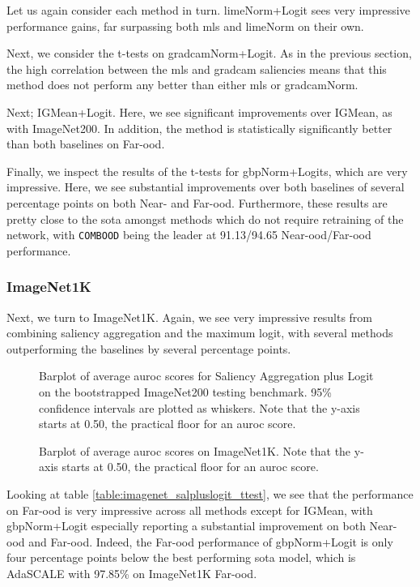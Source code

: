 \documentclass[UKenglish]{uiomasterthesis} %
\theoremstyle{definition}
\begin{document}
Let us again consider each method in turn. \ac{lime}Norm+Logit sees very impressive performance gains, far surpassing both \ac{mls} and \ac{lime}Norm on their own.

Next, we consider the t-tests on \ac{gradcam}Norm+Logit. As in the previous section, the high correlation between the \ac{mls} and \ac{gradcam} saliencies means that this method does not perform any better than either \ac{mls} or \ac{gradcam}Norm.

Next; IGMean+Logit. Here, we see significant improvements over IGMean, as with ImageNet200. In addition, the method is statistically significantly better than both baselines on Far-\ac{ood}.

Finally, we inspect the results of the t-tests for \ac{gbp}Norm+Logits, which are very impressive. Here, we see substantial improvements over both baselines of several percentage points on both Near- and Far-\ac{ood}. Furthermore, these results are pretty close to the \ac{sota} amongst methods which do not require retraining of the network, with \texttt{COMBOOD} being the leader at 91.13/94.65 Near-\ac{ood}/Far-\ac{ood} performance.

\subsubsection{ImageNet1K}

Next, we turn to ImageNet1K. Again, we see very impressive results from combining saliency aggregation and the maximum logit, with several methods outperforming the baselines by several percentage points.

\begin{figure}[H]
    \begin{center}
        
    \end{center}
    \caption[ImageNet200 Saliency Aggregation plus Logit Bootstrap]{Barplot of average \ac{auroc} scores for Saliency Aggregation plus Logit on the bootstrapped ImageNet200 testing benchmark. 95\% confidence intervals are plotted as whiskers. Note that the y-axis starts at 0.50, the practical floor for an \ac{auroc} score.}
    \caption[Average scores]{Barplot of average \ac{auroc} scores on ImageNet1K. Note that the y-axis starts at 0.50, the practical floor for an \ac{auroc} score.}
    \label{fig:imagenet_salpluslogit_bootstrap_barplot}
\end{figure}

Looking at table \ref{table:imagenet_salpluslogit_ttest}, we see that the performance on Far-\ac{ood} is very impressive across all methods except for IGMean, with \ac{gbp}Norm+Logit especially reporting a substantial improvement on both Near-\ac{ood} and Far-\ac{ood}. Indeed, the Far-\ac{ood} performance of \ac{gbp}Norm+Logit is only four percentage points below the best performing \ac{sota} model, which is AdaSCALE \cite{adascale} with 97.85\% on ImageNet1K Far-\ac{ood}.
\end{document}
